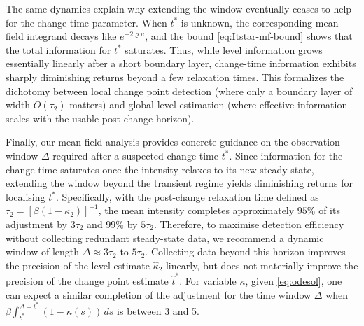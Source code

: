 \documentclass{article}
\theoremstyle{plain}
\theoremstyle{definition}
\newcommand{\1}{\mathbf{1}}
\begin{document}
    
    The same dynamics explain why extending the window eventually ceases to help for the change-time parameter. When $t^\ast$ is unknown, the corresponding mean-field integrand decays like $e^{-2\varrho u}$, and the bound \eqref{eq:Itstar-mf-bound} shows that the total information for $t^\ast$ saturates. Thus, while level information grows essentially linearly after a short boundary layer, change-time information exhibits sharply diminishing returns beyond a few relaxation times. This formalizes the dichotomy between local change point detection (where only a boundary layer of width $O(\tau_2)$ matters) and global level estimation (where effective information scales with the usable post-change horizon). 
    

    Finally, our mean field analysis provides concrete guidance on the observation window $\Delta$ required after a suspected change time $t^\ast$. Since information for the change time saturates once the intensity relaxes to its new steady state, extending the window beyond the transient regime yields diminishing returns for localising $t^\ast$. Specifically, with the post-change relaxation time defined as $\tau_2 = [\beta(1-\kappa_2)]^{-1}$, the mean intensity completes approximately $95\%$ of its adjustment by $3\tau_2$ and $99\%$ by $5\tau_2$.  Therefore, to maximise detection efficiency without collecting redundant steady-state data, we recommend a dynamic window of length $\Delta \approx 3\tau_2$ to $5\tau_2$. Collecting data beyond this horizon improves the precision of the level estimate $\widehat\kappa_2$ linearly, but does not materially improve the precision of the change point estimate $\widehat t^\ast$. For variable $\kappa$, given \eqref{eq:odesol}, one can expect a similar completion of the adjustment for the time window $\Delta$ when $\beta\int_{t^\ast}^{\Delta+t^\ast}(1-\kappa(s))\,ds$ is between 3 and 5.
    
\end{document}
